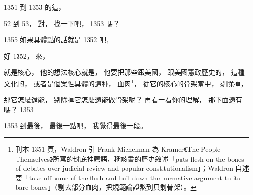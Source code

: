\hypertarget{w06:cue:288}{}1351 到 1353 的這，

\hypertarget{w06:cue:289}{}52 到 53，
\hypertarget{w06:cue:290}{}對，
\hypertarget{w06:cue:291}{}找一下吧，
\hypertarget{w06:cue:292}{}1353 嗎？

\hypertarget{w06:cue:293}{}1355
\hypertarget{w06:cue:294}{}如果具體點的話就是 1352 吧，

\hypertarget{w06:cue:295}{}好 1352，
\hypertarget{w06:cue:296}{}來，

\hypertarget{w06:cue:297}{}就是核心，
\hypertarget{w06:cue:298}{}他的想法核心就是，
\hypertarget{w06:cue:299}{}他要把那些跟美國，
\hypertarget{w06:cue:300}{}跟美國憲政歷史的，
\hypertarget{w06:cue:301}{}這種文化的，
\hypertarget{w06:cue:302}{}或者是個案性具體的這種，
\hypertarget{w06:cue:303}{}血肉\footnote{刊本 1351 頁，Waldron 引 Frank Michelman 為 Kramer《The People Themselves》所寫的封底推薦語，稱該書的歷史敘述「puts flesh on the bones of debates over judicial review and popular constitutionalism」；Waldron 自述要「take off some of the flesh and boil down the normative argument to its bare bones」（剔去部分血肉，把規範論證熬到只剩骨架）。}，
\hypertarget{w06:cue:304}{}從它的核心的骨架當中，
\hypertarget{w06:cue:305}{}剔除掉，

\hypertarget{w06:cue:306}{}那它怎麼還能，
\hypertarget{w06:cue:307}{}剔除掉它怎麼還能做骨架呢？
\hypertarget{w06:cue:308}{}再看一看你的理解，
\hypertarget{w06:cue:309}{}那下面還有嗎？
\hypertarget{w06:cue:310}{}1353

\hypertarget{w06:cue:311}{}1353 到最後，
\hypertarget{w06:cue:312}{}最後一點吧，
\hypertarget{w06:cue:313}{}我覺得最後一段。

